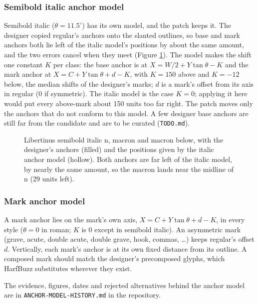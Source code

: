 \documentclass[landscape]{article}
\begin{document}
\subsubsection*{Semibold italic anchor model}

Semibold italic ($\theta = 11.5^\circ$) has its own model, and the patch keeps it.
The designer copied regular's anchors onto the slanted outlines, so base and mark anchors both lie left of the italic model's positions
by about the same amount, and the two errors cancel when they meet (Figure \ref{fig:libertinus-semibolditalic-geometry}).
The model makes the shift one constant $K$ per class:
the base anchor is at $X = W/2 + Y\tan\theta - K$ and the mark anchor at $X = C + Y\tan\theta + d - K$,
with $K = 150$ above and $K = -12$ below, the median shifts of the designer's marks;
$d$ is a mark's offset from its axis in regular (0 if symmetric).
The italic model is the case $K = 0$; applying it here would put every above-mark about 150 units too far right.
The patch moves only the anchors that do not conform to this model.
A few designer base anchors are still far from the candidate and are to be curated (\verb|TODO.md|).

\begin{figure}[htbp]
	\captionsetup{justification=raggedright, singlelinecheck=false}
	
	\caption{Libertinus semibold italic n, macron and macron below, with the designer's anchors (filled)
	and the positions given by the italic anchor model (hollow).
	Both anchors are far left of the italic model, by nearly the same amount, so the macron lands near the midline of n (29 units left).}
	\label{fig:libertinus-semibolditalic-geometry}
\end{figure}

\subsubsection*{Mark anchor model}

A mark anchor lies on the mark's own axis, $X = C + Y\tan\theta + d - K$, in every style
($\theta = 0$ in roman; $K$ is 0 except in semibold italic).
An asymmetric mark (grave, acute, double acute, double grave, hook, commas, \ldots) keeps regular's offset $d$.
Vertically, each mark's anchor is at its own fixed distance from its outline.
A composed mark should match the designer's precomposed glyphs, which HarfBuzz substitutes wherever they exist.

The evidence, figures, dates and rejected alternatives behind the anchor model are in \verb|ANCHOR-MODEL-HISTORY.md| in the repository.
\end{document}
